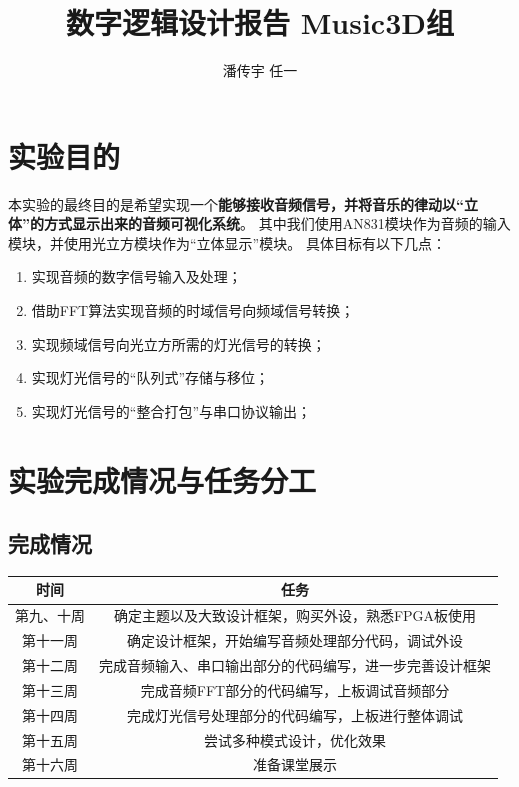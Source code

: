 \documentclass[12pt]{article}
\begin{document}
\title{数字逻辑设计报告 \quad Music3D组}
\author{潘传宇 \quad 任一}
\maketitle

\newpage
\tableofcontents

\newpage
\section{实验目的}
本实验的最终目的是希望实现一个\textbf{能够接收音频信号，并将音乐的律动以“立体”的方式显示出来的音频可视化系统}。
其中我们使用AN831模块作为音频的输入模块，并使用光立方模块作为“立体显示”模块。
具体目标有以下几点：
\begin{enumerate}
    \item 实现音频的数字信号输入及处理；
    \item 借助FFT算法实现音频的时域信号向频域信号转换；
    \item 实现频域信号向光立方所需的灯光信号的转换；
    \item 实现灯光信号的“队列式”存储与移位；
    \item 实现灯光信号的“整合打包”与串口协议输出；
\end{enumerate}

\section{实验完成情况与任务分工}
\subsection{完成情况}
\begin{center}
    \begin{tabular}{|c|c|}
        \hline
        时间& 任务\\
        \hline
        第九、十周& 确定主题以及大致设计框架，购买外设，熟悉FPGA板使用\\
        \hline
        第十一周& 确定设计框架，开始编写音频处理部分代码，调试外设\\
        \hline
        第十二周& 完成音频输入、串口输出部分的代码编写，进一步完善设计框架\\
        \hline
        第十三周& 完成音频FFT部分的代码编写，上板调试音频部分\\
        \hline
        第十四周& 完成灯光信号处理部分的代码编写，上板进行整体调试\\
        \hline
        第十五周& 尝试多种模式设计，优化效果\\
        \hline
        第十六周& 准备课堂展示\\
        \hline
    \end{tabular}
\end{center}
\end{document}
